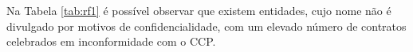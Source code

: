 Na Tabela \ref{tab:rf1} é possível observar que existem entidades, cujo nome não é divulgado por motivos de confidencialidade, com um elevado número de contratos celebrados em inconformidade com o CCP. 




